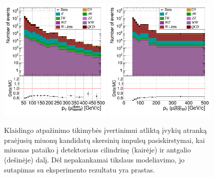 \documentclass[a4paper, 12pt, oneside]{article}
\begin{document}
\begin{figure}[H]
	\includegraphics[width=0.48\textwidth]{Kursinis3/FRest_pT_deno_barrel.png}
	\includegraphics[width=0.48\textwidth]{Kursinis3/FRest_pT_deno_endcap.png}
	\caption{\label{fig:jet_pT_before}
		Klaidingo atpažinimo tikimybės įvertinimui atliktą įvykių atranką praėjusių miuonų kandidatų skersinių impulsų
		pasiskirstymai, kai miuonas pataiko į detektoriaus cilindrinę (kairėje) ir antgalio (dešinėje) dalį.
		Dėl nepakankamai tikslaus modeliavimo, jo sutapimas su eksperimento rezultatu yra prastas.}
\end{figure}
\end{document}
